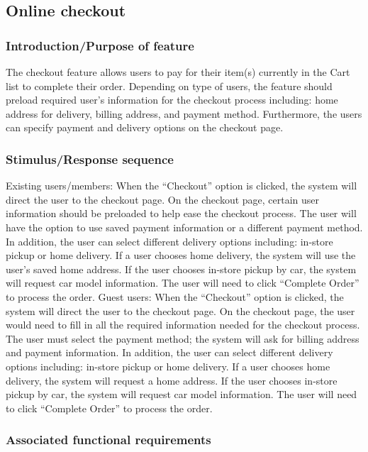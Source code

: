 \documentclass{scrreprt}
\theoremstyle{funreq}
\begin{document}
	
	\subsection{Online checkout}
	
	
	
	\subsubsection{Introduction/Purpose of feature}
	The checkout feature allows users to pay for their item(s) currently in the Cart list to complete their order. Depending on type of users, the feature should preload required user’s information for the checkout process including: home address for delivery, billing address, and payment method. Furthermore, the users can specify payment and delivery options on the checkout page. 
	
	\subsubsection{Stimulus/Response sequence}
	Existing users/members:
	When the “Checkout” option is clicked, the system will direct the user to the checkout page. On the checkout page, certain user information should be preloaded to help ease the checkout process. The user will have the option to use saved payment information or a different payment method. In addition, the user can select different delivery options including: in-store pickup or home delivery. If a user chooses home delivery, the system will use the user's saved home address. If the user chooses in-store pickup by car, the system will request car model information. The user will need to click “Complete Order” to process the order.
	Guest users: 
	When the “Checkout” option is clicked, the system will direct the user to the checkout page. On the checkout page, the user would need to fill in all the required information needed for the checkout process. The user must select the payment method; the system will ask for billing address and payment information. In addition, the user can select different delivery options including: in-store pickup or home delivery. If a user chooses home delivery, the system will request a home address. If the user chooses in-store pickup by car, the system will request car model information. The user will need to click “Complete Order” to process the order.
	
	
	\subsubsection{Associated functional requirements}
	
\end{document}
